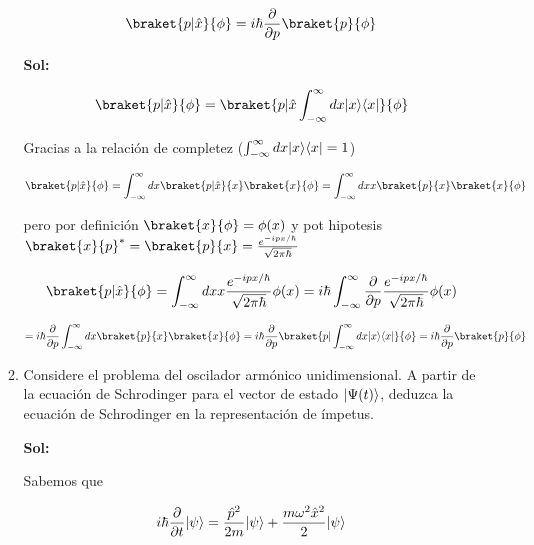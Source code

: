 \documentclass[12pt,a4paper]{article}
\DeclarePairedDelimiter\bra{\langle}{\rvert}
\DeclarePairedDelimiter\ket{\lvert}{\rangle}
\begin{document}
\begin{enumerate}
\begin{enumerate}
    \begin{equation*}
        \braket{p |\hat{x}}{\phi} = i \hbar \frac{\partial}{\partial p} \braket{p}{\phi}
    \end{equation*}
    
    \textbf{Sol:}
    
    \begin{equation*}
        \braket{p|\hat{x}}{\phi} = \braket{p | \hat{x}\int_{-\infty}^{\infty} dx\ket{x}\bra{x} }{\phi}
    \end{equation*}
    
    Gracias a la relación de completez ($\int_{-\infty}^{\infty} dx \ket{x}\bra{x} = 1$)
    
    \begin{equation*}
        \braket{p|\hat{x}}{\phi} = \int_{-\infty}^{\infty} dx \braket{p|\hat{x}}{x} \braket{x}{\phi} = \int_{-\infty}^{\infty} dx x \braket{p}{x} \braket{x}{\phi}
    \end{equation*}
    
    pero por definición $\braket{x}{\phi} = \phi (x)$ y pot hipotesis $\braket{x}{p}^{*}= \braket{p}{x} = \frac{e^{-ipx/\hbar}}{\sqrt{2\pi \hbar}}$
    
    \begin{equation*}
        \braket{p|\hat{x}}{\phi} = \int_{-\infty}^{\infty} dx x \frac{e^{-ipx/\hbar}}{\sqrt{2\pi \hbar}} \phi (x) = i \hbar \int_{-\infty}^{\infty} \frac{\partial}{\partial p} \frac{e^{-ipx/\hbar}}{\sqrt{2\pi \hbar}} \phi (x)
    \end{equation*}
    
    \begin{equation*}
        = i \hbar  \frac{\partial}{\partial p} \int_{-\infty}^{\infty} dx \braket{p}{x} \braket{x}{\phi} = i \hbar \frac{\partial}{\partial p} \braket{p|\int_{-\infty}^{\infty}dx\ket{x}\bra{x}}{\phi} = i \hbar \frac{\partial}{\partial p} \braket{p}{\phi}
    \end{equation*}
    
    
    
    \item Considere el problema del oscilador armónico unidimensional. A partir de la ecuación de Schrodinger para el vector de estado $\ket{\Psi (t)}$, deduzca la ecuación de Schrodinger en la representación de ímpetus.
    
    \textbf{Sol:}
    
    Sabemos que
    
    \begin{equation*}
        i \hbar \frac{\partial}{\partial t} \ket{\psi} = \frac{\hat{p}^2}{2m} \ket{\psi} + \frac{m \omega^2 \hat{x}^2}{2} \ket{\psi}
    \end{equation*}
    

\end{enumerate}
\end{enumerate}
\end{document}
